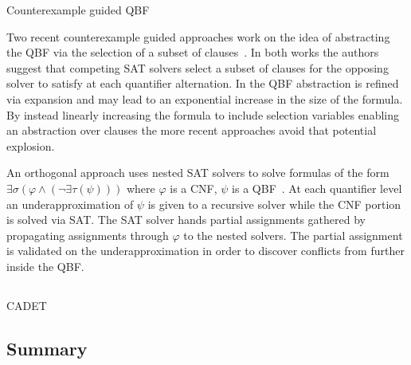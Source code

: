 \begin{algorithm}

    \caption{Counterexample guided QBF}
    \label{alg:rareqs}
\end{algorithm}

Two recent counterexample guided approaches work on the idea of abstracting the QBF via the selection of a subset of clauses~\cite{Rabe15,Janota15}. In both works the authors suggest that competing SAT solvers select a subset of clauses for the opposing solver to satisfy at each quantifier alternation. In \cite{Janota12} the QBF abstraction is refined via expansion and may lead to an exponential increase in the size of the formula. By instead linearly increasing the formula to include selection variables enabling an abstraction over clauses the more recent approaches avoid that potential explosion.

An orthogonal approach uses nested SAT solvers to solve formulas of the form $\exists \sigma (\varphi \land (\lnot \exists \tau (\psi)))$ where $\varphi$ is a CNF, $\psi$ is a QBF~\cite{Bogaerts16}. At each quantifier level an underapproximation of $\psi$ is given to a recursive solver while the CNF portion is solved via SAT. The SAT solver hands partial assignments gathered by propagating assignments through $\varphi$ to the nested solvers. The partial assignment is validated on the underapproximation in order to discover conflicts from further inside the QBF. 

\subsection{}

CADET

\subsection{Summary}


